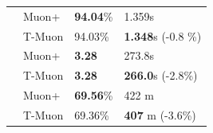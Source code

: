 \begin{table}[t]
\begin{subtable}{0.51\linewidth}
\begin{tabular}{p{40pt}p{34pt}p{22pt}p{60pt}}
         & \textcolor{dioncolor}{Muon+}   & \textbf{94.04}\%  & 1.359s \\
        & \textcolor{turbomuoncolor}{T-Muon}   & 94.03\%  & \textbf{1.348}s  (-0.8 \%) %
         \\
        \hline
        & \textcolor{dioncolor}{Muon+}   & \textbf{3.28}  & 273.8s \\
         & \textcolor{turbomuoncolor}{T-Muon}   & \textbf{3.28}  & \textbf{266.0}s (-2.8\%) %
         \\
        \hline
         & \textcolor{dioncolor}{Muon+}    & \textbf{69.56}\%  & 422 m \\
         & \textcolor{turbomuoncolor}{T-Muon}   & 69.36\%  & \textbf{407} m (-3.6\%) %
         \\
          

\end{tabular}
\end{subtable}
\end{table}
